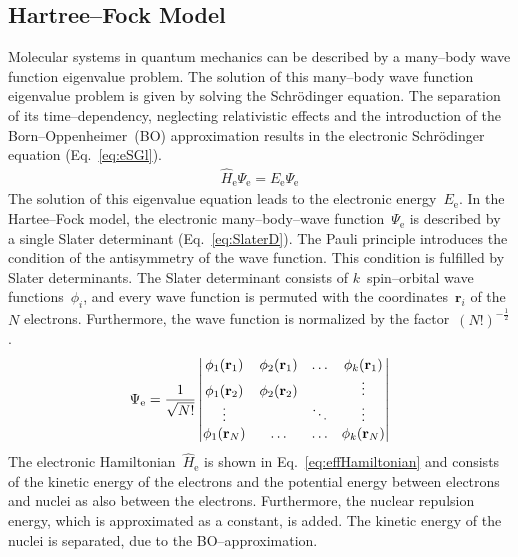 \subsection{Hartree--Fock Model}
Molecular systems in quantum mechanics can be described by a many--body wave function eigenvalue problem.
The solution of this many--body wave function eigenvalue problem is given by solving the Schrödinger equation. The separation of its time--dependency, neglecting relativistic effects and
the introduction of the \mbox{Born--Oppenheimer (BO)} approximation results in the electronic Schrödinger equation (Eq.~\eqref{eq:eSGl}).
\begin{align}
	\label{eq:eSGl}
	\hat{H}_\mathrm{e} \Psi_\mathrm{e} = E_\mathrm{e} \Psi_\mathrm{e}
\end{align}
The solution of this eigenvalue equation leads to the electronic energy~$E_\mathrm{e}$.
In the Hartee--Fock model, the electronic many--body--wave function~$\Psi_\mathrm{e}$ is described by a single Slater determinant (Eq.~\eqref{eq:SlaterD}).
The Pauli principle introduces the condition of the antisymmetry of the wave function.
This condition is fulfilled by Slater determinants.
The Slater determinant consists of $k$~spin--orbital wave functions~$\phi_i$,
and every wave function is permuted with the coordinates~$\textbf{r}_i$ of the $N$ electrons.
Furthermore, the wave function is normalized by the factor~$(N!)^{-\frac{1}{2}}$.
\begin{align}
	\label{eq:SlaterD}
	\Psi_\mathrm{e} = \dfrac{1}{\sqrt{N!}} \begin{vmatrix}
		\phi_1(\textbf{r}_1) & \phi_2(\textbf{r}_1)& \hdotsfor{1}&  \phi_k(\textbf{r}_1)\\
		\phi_1(\textbf{r}_2) &  \phi_2(\textbf{r}_2) & & \vdots\\
		\vdots& & \ddots& \vdots \\
		\phi_1(\textbf{r}_N)& \hdots& \hdotsfor{0} & \phi_k(\textbf{r}_N)\\
	\end{vmatrix}
\end{align}
\newpage
The electronic Hamiltonian~$\hat{H}_\mathrm{e}$ is shown in Eq.~\eqref{eq:effHamiltonian}
and consists of the kinetic energy of the electrons and the potential energy between electrons and nuclei as also between the electrons.
Furthermore, the nuclear repulsion energy, which is approximated as a constant, is added.
The kinetic energy of the nuclei is separated, due to the \mbox{BO--approximation}.
